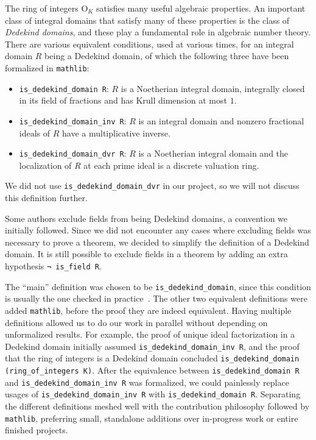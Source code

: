 \documentclass[a4paper,USenglish,cleveref, autoref, thm-restate]{lipics-v2021}
\newcommand{\lean}[1]{\texttt{#1}\xspace} %
\newcommand{\OK}{\mathrm{O}_K}
\newcommand{\mathlib}{\texttt{mathlib}\xspace}
\begin{document}
The ring of integers $\OK$ satisfies many useful algebraic properties.
An important class of integral domains that satisfy many of these properties is the class of \emph{Dedekind domains},
and these play a fundamental role in algebraic number theory.
There are various equivalent conditions, used at various times, for an integral domain $R$ being a Dedekind domain,
of which the following three have been formalized in \mathlib:
\begin{itemize}
\item \lean{is\_dedekind\_domain R}: $R$ is a Noetherian integral domain, integrally closed in its field of fractions and has Krull dimension at most $1$.
\item \lean{is\_dedekind\_domain\_inv R}: $R$ is an integral domain and nonzero fractional ideals of $R$ have a multiplicative inverse.
\item \lean{is\_dedekind\_domain\_dvr R}: $R$ is a Noetherian integral domain and the localization of $R$ at each prime ideal is a discrete valuation ring.
\end{itemize}
We did not use \lean{is\_dedekind\_domain\_dvr} in our project, so we will not discuss this definition further.

Some authors exclude fields from being Dedekind domains, a convention we initially followed.
Since we did not encounter any cases where excluding fields was necessary to prove a theorem,
we decided to simplify the definition of a Dedekind domain.
It is still possible to exclude fields in a theorem by adding an extra hypothesis \lean{¬ is\_field R}.

The ``main'' definition was chosen to be \lean{is\_dedekind\_domain},
since this condition is usually the one checked in practice~\cite{Neukirch}.
The other two equivalent definitions were added \mathlib, before the proof they are indeed equivalent.
Having multiple definitions allowed us to do our work in parallel without depending on unformalized results.
For example,
the proof of unique ideal factorization in a Dedekind domain initially assumed \lean{is\_dedekind\_domain\_inv R},
and the proof that the ring of integers is a Dedekind domain concluded \lean{is\_dedekind\_domain (ring\_of\_integers K)}.
After the equivalence between \lean{is\_dedekind\_domain R} and \lean{is\_dedekind\_domain\_inv R} was formalized,
we could painlessly replace usages of \lean{is\_dedekind\_domain\_inv R} with \lean{is\_dedekind\_domain R}.
Separating the different definitions meshed well with the contribution philosophy followed by \mathlib, preferring small, standalone additions over in-progress work or entire finished projects.
\end{document}
